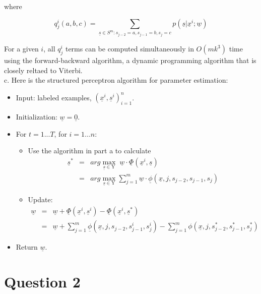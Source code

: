 \documentclass[12pt]{article}
\begin{document}
where

\begin{equation*}
q_j^i(a,b,c) =
\sum_{\underline {s} \in S^m: s_{j-2} = a, s_{j-1} = b, s_j = c}
{p(\underline {s} | \underline {x}^i; \underline {w})}
\end{equation*}

For a given $i$, all $q_j^i$ terms can be computed simultaneously in
$O(mk^3)$ time using the forward-backward algorithm, a dynamic
programming algorithm that is closely reltaed to Viterbi.\\

c. Here is the structured perceptron algorithm for parameter
estimation:

\begin{itemize}
\item Input: labeled examples, ${(\underline {x}^i,
    \underline{s}^i)}_{i=1}^n$.
\item Initialization: $\underline {w} = \underline {0}$.
\item For $t = 1...T$, for $i = 1...n:$
  \begin{itemize}
    \item Use the algorithm in part a to calculate
      \begin{eqnarray*}
        \underline {s}^* &=& arg \max_{\underline {s} \in \mathrm{Y}} \;
        {\underline {w} \cdot \underline {\Phi} (\underline {x}^i,
          \underline {s})} \\
        &=& arg \max_{\underline{s} \in \mathrm{Y}} {\sum_{j=1}^m
          {\underline {w} \cdot \underline {\phi} (\underline {x}, j,
            s_{j-2}, s_{j-1}, s_j) }}
      \end{eqnarray*}
    \item Update:
      \begin{eqnarray*}
        \underline {w} &=& \underline {w} + \underline
        {\Phi} (\underline {x}^i, \underline{s}^i) - \underline{\Phi}
        (\underline {x}^i, \underline{s}^*)\\
        &=& \underline {w} + \sum_{j=1}^m {\underline {\phi}
          (\underline {x}, j, s_{j-2}, s_{j-1}^i, s_j^i)} -
        \sum_{j=1}^m {\phi} (\underline {x}, j, s_{j-2}^*, s_{j-1}^*, s_j^*)
      \end{eqnarray*}
  \end{itemize}
\item Return $\underline {w}$.
\end{itemize}

\section*{Question 2}
\end{document}
